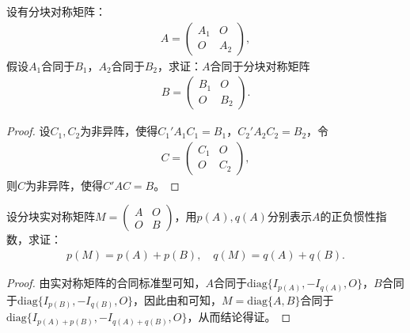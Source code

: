 \documentclass[../../main.tex]{subfiles}
\begin{document}
\begin{proposition}\label{proposition:分块准对角阵合同于每个块的合同阵}
设有分块对称矩阵：
\begin{align*}
A = \begin{pmatrix}
A_1 & O \\
O & A_2
\end{pmatrix},
\end{align*}
假设\(A_1\)合同于\(B_1\)，\(A_2\)合同于\(B_2\)，求证：\(A\)合同于分块对称矩阵
\begin{align*}
B = \begin{pmatrix}
B_1 & O \\
O & B_2
\end{pmatrix}.
\end{align*}
\end{proposition} 
\begin{proof}
设\(C_1,C_2\)为非异阵，使得\(C_1'A_1C_1 = B_1\)，\(C_2'A_2C_2 = B_2\)，令
\begin{align*}
C = \begin{pmatrix}
C_1 & O \\
O & C_2
\end{pmatrix},
\end{align*}
则\(C\)为非异阵，使得\(C'AC = B\)。
\end{proof}

\begin{proposition}\label{proposition:分块准对角阵的正负惯性指数}
设分块实对称矩阵\(M = \begin{pmatrix}
A & O \\
O & B
\end{pmatrix}\)，用\(p(A),q(A)\)分别表示\(A\)的正负惯性指数，求证：
\begin{align*}
p(M)=p(A)+p(B),\quad q(M)=q(A)+q(B).
\end{align*}
\end{proposition} 
\begin{proof}
由实对称矩阵的合同标准型可知，\(A\)合同于\(\mathrm{diag}\{I_{p(A)}, -I_{q(A)},O\}\)，\(B\)合同于\(\mathrm{diag}\{I_{p(B)}, -I_{q(B)},O\}\)，因此由和可知，\(M = \mathrm{diag}\{A,B\}\)合同于\(\mathrm{diag}\{I_{p(A)+p(B)}, -I_{q(A)+q(B)},O\}\)，从而结论得证。
\end{proof}
\end{document}
